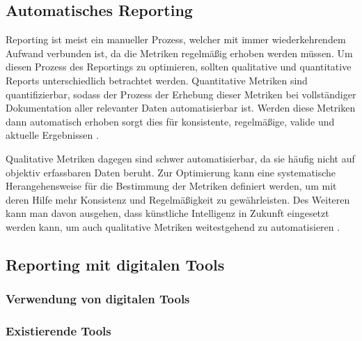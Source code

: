 \subsection{Automatisches Reporting}
Reporting ist meist ein manueller Prozess, welcher mit immer wiederkehrendem Aufwand verbunden ist, da die Metriken regelmäßig erhoben werden müssen. Um diesen Prozess des Reportings zu optimieren, sollten qualitative und quantitative Reports unterschiedlich betrachtet werden.
Quantitative Metriken sind quantifizierbar, sodass der Prozess der Erhebung dieser Metriken bei vollständiger Dokumentation aller relevanter Daten automatisierbar ist. Werden diese Metriken dann automatisch erhoben sorgt dies für konsistente, regelmäßige, valide und aktuelle Ergebnissen \cite{}.

Qualitative Metriken dagegen sind schwer automatisierbar, da sie häufig nicht auf objektiv erfassbaren Daten beruht. Zur Optimierung kann eine systematische Herangehensweise für die Bestimmung der Metriken definiert werden, um mit deren Hilfe  mehr Konsistenz und Regelmäßigkeit zu gewährleisten. Des Weiteren kann man davon ausgehen, dass künstliche Intelligenz in Zukunft eingesetzt werden kann, um auch qualitative Metriken weitestgehend zu automatisieren \cite{}.

\subsection{Reporting mit digitalen Tools}
\subsubsection{Verwendung von digitalen Tools}
\cite{guidelinesForPortfoliomanagement}

\subsubsection{Existierende Tools}
